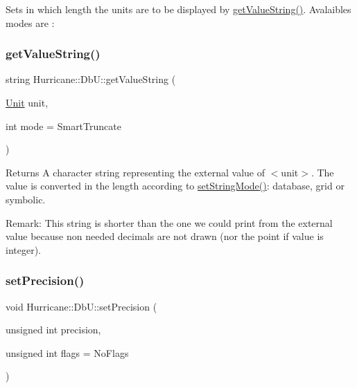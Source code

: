 Sets in which length the units are to be displayed by \hyperlink{group__DbUGroup_gadc9c1a06b4296dbddcf711077113f4bd}{get\+Value\+String()}. Avalaibles modes are \+: \mbox{\label{group__DbUGroup_gadc9c1a06b4296dbddcf711077113f4bd}} 
\subsubsection{\texorpdfstring{get\+Value\+String()}{getValueString()}}
{\footnotesize\ttfamily string Hurricane\+::\+Db\+U\+::get\+Value\+String (\begin{DoxyParamCaption}\item[{\hyperlink{group__DbUGroup_ga4fbfa3e8c89347af76c9628ea06c4146}{Unit}}]{unit,  }\item[{int}]{mode = {\ttfamily SmartTruncate} }\end{DoxyParamCaption})\hspace{0.3cm}{\ttfamily [static]}}

\begin{DoxyReturn}{Returns}
A character string representing the external value of {\ttfamily $<$unit$>$}. The value is converted in the length according to \hyperlink{group__DbUGroup_ga89ab8f8326c54113336086663ecf1d25}{set\+String\+Mode()}\+: database, grid or symbolic.
\end{DoxyReturn}
\begin{DoxyParagraph}{Remark\+:}
This string is shorter than the one we could print from the external value because non needed decimals are not drawn (nor the point if value is integer). 
\end{DoxyParagraph}
\mbox{\label{group__DbUGroup_gace9a8644e7e80dcaed2a8a95deeb1622}} 
\subsubsection{\texorpdfstring{set\+Precision()}{setPrecision()}}
{\footnotesize\ttfamily void Hurricane\+::\+Db\+U\+::set\+Precision (\begin{DoxyParamCaption}\item[{unsigned int}]{precision,  }\item[{unsigned int}]{flags = {\ttfamily NoFlags} }\end{DoxyParamCaption})\hspace{0.3cm}{\ttfamily [static]}}

